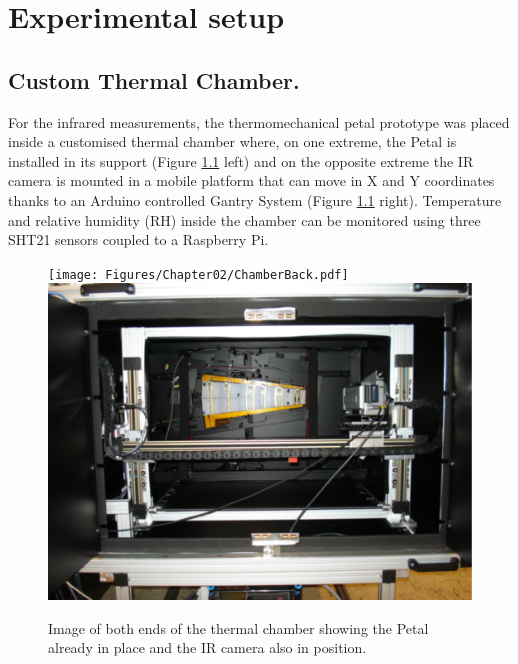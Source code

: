 \pagestyle{standard}

\chapter{Experimental setup}\label{chapter2}

	\thispagestyle{chapter-first-page}
	
	\section{Custom Thermal Chamber.}\label{section2.1}
	
		For the infrared measurements, the thermomechanical petal prototype was placed inside a customised thermal chamber where, on one extreme, the Petal is installed in its support (Figure \ref{fig2.1} left) and on the opposite extreme the IR camera is mounted in a mobile platform that can move in X and Y coordinates thanks to an Arduino controlled Gantry System (Figure \ref{fig2.1} right). Temperature and relative humidity (RH) inside the chamber can be monitored using three SHT21 sensors coupled to a Raspberry Pi.
		
		\begin{figure}[ht!]
			\centering
			\captionsetup{justification=centering,margin=2cm}
			\texttt{[image: Figures/Chapter02/ChamberBack.pdf]}
			\includegraphics[scale=0.26]{Figures/Chapter02/CamberFront.pdf}
			\caption{Image of both ends of the thermal chamber showing the Petal already in place and the IR camera also in position.}\label{fig2.1}
		\end{figure}
		
